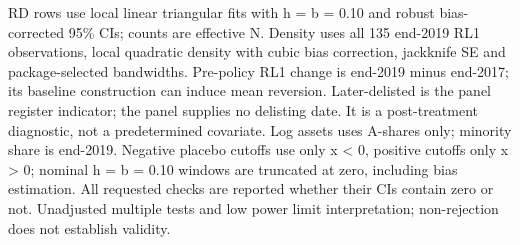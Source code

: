 \begin{table}[!htbp]
\centering\small
\caption{RL1 RD validity checks}
\label{tab:t024_rd_validity}
\par\smallskip
\begin{minipage}{\linewidth}\footnotesize
RD rows use local linear triangular fits with h = b = 0.10 and robust bias-corrected 95\% CIs; counts are effective N. Density uses all 135 end-2019 RL1 observations, local quadratic density with cubic bias correction, jackknife SE and package-selected bandwidths. Pre-policy RL1 change is end-2019 minus end-2017; its baseline construction can induce mean reversion. Later-delisted is the panel register indicator; the panel supplies no delisting date. It is a post-treatment diagnostic, not a predetermined covariate. Log assets uses A-shares only; minority share is end-2019. Negative placebo cutoffs use only x \textless{} 0, positive cutoffs only x \textgreater{} 0; nominal h = b = 0.10 windows are truncated at zero, including bias estimation. All requested checks are reported whether their CIs contain zero or not. Unadjusted multiple tests and low power limit interpretation; non-rejection does not establish validity.
\end{minipage}
\end{table}


